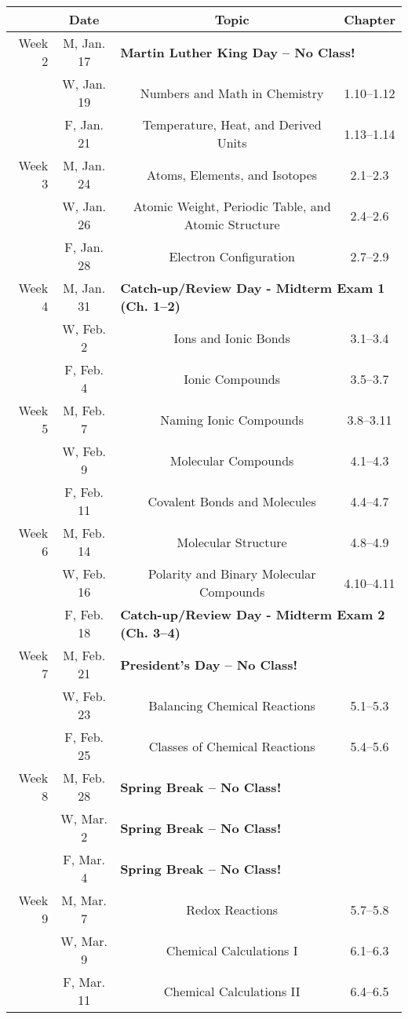 \documentclass[12pt, letterpaper]{article}
\begin{document}
\begin{tabular}{rcccc}
	& Date && Topic & Chapter\\
	\midrule
	Week 2 & M, Jan. 17& \multicolumn{3}{l}{\textbf{Martin Luther King Day -- No Class!}}\\
	& W, Jan. 19&& Numbers and Math in Chemistry & 1.10--1.12\\
	& F, Jan. 21&& Temperature, Heat, and Derived Units & 1.13--1.14\\
	\midrule
	Week 3 & M, Jan. 24&& Atoms, Elements, and Isotopes & 2.1--2.3\\
	& W, Jan. 26&& Atomic Weight, Periodic Table, and Atomic Structure & 2.4--2.6\\
	& F, Jan. 28&& Electron Configuration & 2.7--2.9\\
	\midrule
	Week 4 & M, Jan. 31& \multicolumn{3}{l}{\textbf{Catch-up/Review Day - Midterm Exam 1 (Ch. 1--2)}}\\
	& W, Feb. 2&& Ions and Ionic Bonds & 3.1--3.4\\
	& F, Feb. 4&& Ionic Compounds & 3.5--3.7\\
	\midrule
	Week 5 & M, Feb. 7&& Naming Ionic Compounds & 3.8--3.11\\
	& W, Feb. 9&& Molecular Compounds & 4.1--4.3\\
	& F, Feb. 11&& Covalent Bonds and Molecules & 4.4--4.7\\
	\midrule
	Week 6 & M, Feb. 14&& Molecular Structure & 4.8--4.9\\
	& W, Feb. 16&& Polarity and Binary Molecular Compounds & 4.10--4.11\\
	& F, Feb. 18& \multicolumn{3}{l}{\textbf{Catch-up/Review Day - Midterm Exam 2 (Ch. 3--4)}}\\
	\midrule
	Week 7 & M, Feb. 21& \multicolumn{3}{l}{\textbf{President's Day -- No Class!}}\\
	& W, Feb. 23&& Balancing Chemical Reactions & 5.1--5.3\\
	& F, Feb. 25&& Classes of Chemical Reactions & 5.4--5.6\\
	\midrule
	Week 8 & M, Feb. 28& \multicolumn{3}{l}{\textbf{Spring Break -- No Class!}}\\
	& W, Mar. 2& \multicolumn{3}{l}{\textbf{Spring Break -- No Class!}}\\
	& F, Mar. 4& \multicolumn{3}{l}{\textbf{Spring Break -- No Class!}}\\
	\midrule
	Week 9 & M, Mar. 7&& Redox Reactions & 5.7--5.8\\
	& W, Mar. 9&& Chemical Calculations I & 6.1--6.3\\
	& F, Mar. 11&& Chemical Calculations II & 6.4--6.5\\
\end{tabular}
\end{document}
